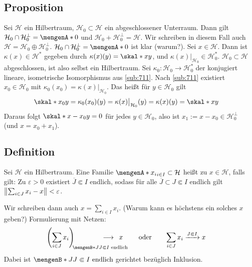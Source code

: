 \subsection[Proposition über Schnitt und Summe eines Unterraumes mit seinem orthogonalen Komplement]{Proposition} %
\label{sub:715}
Sei $\mathcal{H}$ ein Hilbertraum, $\mathcal{H}_0 \subset \mathcal{H}$ ein abgeschlossener Unterraum. Dann gilt $\mathcal{H}_0 \cap \mathcal{H}_0^\bot = \set{0}$ und 
$\mathcal{H}_0 + \mathcal{H}_0^\bot = \mathcal{H}$. Wir schreiben in diesem Fall auch $\mathcal{H} = \mathcal{H}_0 \oplus \mathcal{H}_0^\bot$.
$\mathcal{H}_0 \cap \mathcal{H}_0^\bot= \set{0}$ ist klar (warum?). Sei $x \in \mathcal{H}$. Dann ist $\kappa(x) \in \mathcal{H}^*$ gegeben durch 
$\kappa(x)(y)=\skal*{x}{y}$, und $\kappa(x)|_{\mathcal{H}_0} \in \mathcal{H}_0^*$. $\mathcal{H}_0 \subset \mathcal{H}$ abgeschlossen, ist also selbst ein Hilbertraum. 
Sei $\kappa_0 \colon \mathcal{H}_0 \to \mathcal{H}_0^*$ der konjugiert lineare, isometrische Isomorphismus aus \ref{sub:711}. Nach \ref{sub:711} existiert 
$x_0 \in \mathcal{H}_0$ mit $\kappa_0(x_0)= \kappa(x)|_{\mathcal{H}_0}$. Das heißt für $y \in \mathcal{H}_0$ gilt 
\begin{align*}
	\skal*{x_0}{y} = \kappa_0(x_0)(y) = \kappa(x)\big|_{\mathcal{H}_0}(y) = \kappa(x)(y) = \skal*{x}{y}
\end{align*}
Daraus folgt $\skal*{x-x_0}{y}=0$ für jedes $y \in \mathcal{H_0}$, also ist $x_1 := x-x_0 \in \mathcal{H}_0^\bot$ (und $x=x_0+x_1$). \bewende

\subsection[Definition: Summierbar]{Definition} %
\label{sub:716}
Sei $\mathcal{H}$ ein Hilbertraum. Eine Familie $\set{x_i}_{i \in I} \subset \mathcal{H}$ heißt  zu $x \in \mathcal{H}$, falls gilt: 
Zu $\varepsilon>0$ existiert $\overline{J} \Subset I$ endlich, sodass für alle $\overline{J} \subset J \Subset I$ endlich gilt $\norm{\sum_{i \in J}x_i - x } < \varepsilon$.

Wir schreiben dann auch $x= \sum_{i \in I} x_i$. (Warum kann es höchstens ein solches $x$ geben?) Formulierung mit Netzen: 
\[
	\enbrace*{\sum_{i \in J} x_i}_{\!\!\set[J]{J \Subset I \text{ endlich}}} \hspace{-4em} \longrightarrow \enspace x \qquad \text{ oder} \qquad \sum_{i \in J}x_i \xrightarrow{J \Subset I} x 
\]
Dabei ist $\set[J]{J \Subset I \text{ endlich}}$ gerichtet bezüglich Inklusion.

